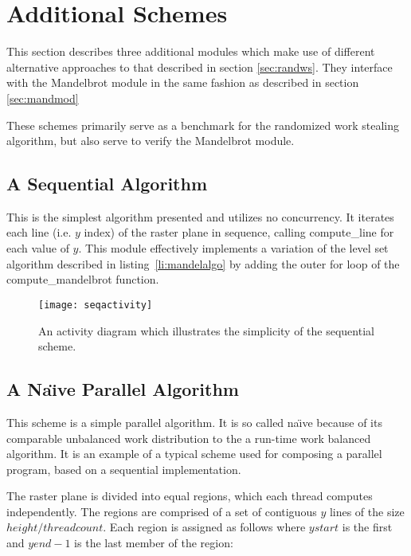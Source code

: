 \section{Additional Schemes}
\label{sec:addscheme}

This section describes three additional modules which make use of different alternative 
approaches to that described in section \ref{sec:randws}. 
They interface with the Mandelbrot module in the same fashion as described in section \ref{sec:mandmod}

These schemes primarily serve as a benchmark for the randomized work stealing algorithm, but also 
serve to verify the Mandelbrot module.

\subsection*{A Sequential Algorithm}

This is the simplest algorithm presented and utilizes no concurrency.
It iterates each line (i.e. \(y\) index) of the raster plane in sequence, calling compute\_line for each value of \(y\).
This module effectively implements a variation of the level set algorithm described in listing~\ref{li:mandelalgo}
by adding the outer for loop of the compute\_mandelbrot function.

\begin{figure}[h]
\centering
\texttt{[image: seqactivity]}
\caption{
    An activity diagram which illustrates the simplicity of the sequential scheme.
}
\label{fig:seqactivity}
\end{figure}

\subsection*{A Na\"{\i}ve Parallel Algorithm}

This scheme is a simple parallel algorithm. It is so called na\"{\i}ve because of its comparable unbalanced work distribution to
the a run-time work balanced algorithm. It is an example of a typical scheme used for composing a parallel program, based on a 
sequential implementation.

The raster plane is divided into equal regions, which each thread computes independently.
The regions are comprised of a set of contiguous \(y\) lines of the size \(height / threadcount\).
Each region is assigned as follows where \(ystart\) is the first and \(yend - 1\) is the last member of the region: 

